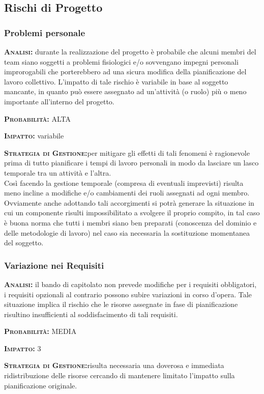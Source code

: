 \subsection{Rischi di Progetto}
\subsubsection{Problemi personale}
\begin{description}
	\item{\scshape\bfseries Analisi:} durante la realizzazione del progetto è probabile che alcuni membri del team siano soggetti a problemi fisiologici e/o sovvengano impegni personali improrogabili che porterebbero ad una sicura modifica della pianificazione del lavoro collettivo. L'impatto di tale rischio è variabile in base al soggetto mancante, in quanto può essere assegnato ad un'attività (o ruolo) più o meno importante all'interno del progetto.
	\item{\scshape\bfseries Probabilità:} ALTA
	\item{\scshape\bfseries Impatto:} variabile
	\item{\scshape\bfseries Strategia di Gestione:}per mitigare gli effetti di tali fenomeni è ragionevole prima di tutto pianificare i tempi di lavoro personali in modo da lasciare un lasco temporale tra un attività e l'altra.\\ 
Così facendo la gestione temporale (compresa di eventuali imprevisti) risulta meno incline a modifiche e/o cambiamenti dei ruoli assegnati ad ogni membro. Ovviamente anche adottando tali accorgimenti si potrà generare la situazione in cui un componente risulti impossibilitato a svolgere il proprio compito, in tal caso è buona norma che tutti i membri siano ben preparati (conoscenza del dominio e delle metodologie di lavoro) nel caso sia necessaria la sostituzione momentanea del soggetto.
\end{description}

\subsubsection{Variazione nei Requisiti}
\begin{description}
	\item{\scshape\bfseries Analisi:} il bando di capitolato non prevede modifiche per i requisiti obbligatori, i requisiti opzionali al contrario possono subire variazioni in corso d'opera. Tale situazione implica il rischio che le risorse assegnate in fase di pianificazione risultino insufficienti al soddisfacimento di tali requisiti.
	\item{\scshape\bfseries Probabilità:} MEDIA
	\item{\scshape\bfseries Impatto:} 3
	\item{\scshape\bfseries Strategia di Gestione:}risulta necessaria una doverosa e immediata ridistribuzione delle risorse cercando di mantenere limitato l'impatto sulla pianificazione originale.
\end{description}


